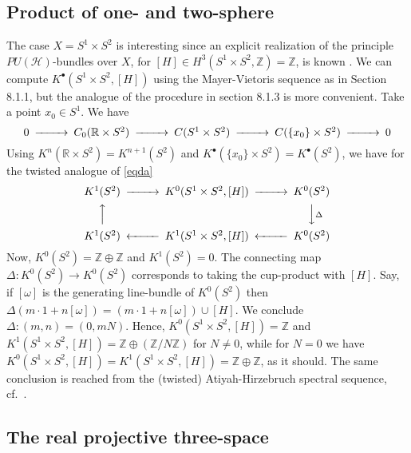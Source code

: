 \documentclass[a4paper,reqno]{amsart}
\theoremstyle{plain}
\theoremstyle{definition}
\theoremstyle{remark}
\numberwithin{equation}{section}
\numberwithin{figure}{section}
\newcommand{\cH}{{\mathcal H}}
\newcommand{\RR}{{\mathbb R}}
\newcommand{\ZZ}{{\mathbb Z}}
\newcommand{\<}{\langle}
\renewcommand{\>}{\rangle}
\begin{document}
\subsection{Product of one- and two-sphere}

The case $X=S^1\times S^2$ is interesting since an explicit
realization of the principle $PU(\cH)$-bundles over $X$,
for $[H]\in H^3(S^1\times S^2,\ZZ)=\ZZ$, is known
\cite{Bry}.
We can compute $K^\bullet(S^1\times S^2,[H])$ using the Mayer-Vietoris
sequence as in Section 8.1.1, but the analogue of the procedure in
section 8.1.3 is more convenient.  Take a point $x_0\in S^1$. We have
\begin{equation} \label{eqda}
\begin{CD}
0 @>>> C_0(\RR\times S^2) @>>> C(S^1\times S^2) @>>>
C(\{x_0\}\times S^2) @>>> 0
\end{CD}
\end{equation}
Using $K^n(\RR\times S^2) = K^{n+1}(S^2)$ and
$K^\bullet(\{x_0\}\times S^2) =
K^\bullet(S^2)$, we have for the twisted analogue of \eqref{eqda}
\begin{equation} \label{eqdb}
\begin{CD}
K^1(S^2) @>>> K^0(S^1\times S^2,[H]) @>>>   K^0(S^2) \\
        @AAA      &            &      @VV\Delta V \\
K^1(S^2)   @<<< K^1(S^1\times S^2,[H]) @<<<    K^0(S^2)
\end{CD}
\end{equation}
Now, $K^0(S^2) = \ZZ\oplus \ZZ$ and $K^1(S^2)=0$.  The connecting
map $\Delta: K^0(S^2) \to K^0(S^2)$ corresponds to taking the cup-product
with $[H]$.  Say, if $[\omega]$ is the generating line-bundle of $K^0(S^2)$
then $\Delta (m\cdot 1 + n [\omega]) = (m\cdot 1 + n [\omega])\cup [H]$.
We conclude $\Delta: (m,n) = (0,mN)$.  Hence,
$K^0(S^1\times S^2,[H]) = \ZZ$ and $K^1(S^1\times S^2,[H]) = \ZZ \oplus
(\ZZ/N\ZZ)$ for $N\neq0$, while for $N=0$ we have
$K^0(S^1\times S^2,[H]) = K^1(S^1\times S^2,[H]) = \ZZ \oplus\ZZ$,
as it should.
The same conclusion is reached from the (twisted) Atiyah-Hirzebruch
spectral sequence, cf.\ \cite{Rosa}.



\subsection{The real projective three-space}
\end{document}
